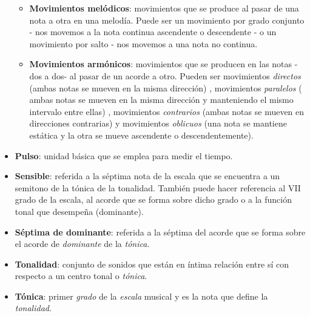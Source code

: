 \begin{itemize}[label={}, leftmargin=*]
	\begin{itemize}

		\item \textbf{Movimientos melódicos}: movimientos que se produce al pasar de una nota a otra en una melodía. Puede ser un movimiento por grado conjunto - nos movemos a la nota continua ascendente o descendente - o un movimiento por salto - nos movemos a una nota no continua.

		\item \textbf{Movimientos armónicos}: movimientos que se producen en las notas -dos a dos- al pasar de un acorde a otro. Pueden ser movimientos \textit{directos} (ambas notas se mueven en la misma dirección) , movimientos \textit{paralelos} ( ambas notas se mueven en la misma dirección y manteniendo el mismo intervalo entre ellas) , movimientos \textit{contrarios} (ambas notas se mueven en direcciones contrarias) y movimientos \textit{oblicuos} (una nota se mantiene estática y la otra se mueve ascendente o descendentemente).

	\end{itemize}

	\label{pulso}
	\item \textbf{Pulso}: unidad básica que se emplea para medir el tiempo.

	\bigskip

	\label{sensible}
	\item \textbf{Sensible}: referida a la séptima nota de la escala que se encuentra a un semitono de la tónica de la tonalidad. También puede hacer referencia al VII grado de la escala, al acorde que se forma sobre dicho grado o a la función tonal que desempeña (dominante). 

	\bigskip

	\label{septima}
	\item \textbf{Séptima de dominante}: referida a la séptima del acorde que se forma sobre el acorde de \textit{dominante} de la \textit{tónica}.

	\bigskip

	\label{tonalidad}
	\item \textbf{Tonalidad}: conjunto de sonidos que están en íntima relación entre sí con respecto a un centro tonal o \textit{tónica}.

	\bigskip

	\label{tonica}
	\item \textbf{Tónica}: primer \textit{grado} de la \textit{escala} musical y es la nota que define la \textit{tonalidad}. 

\end{itemize}